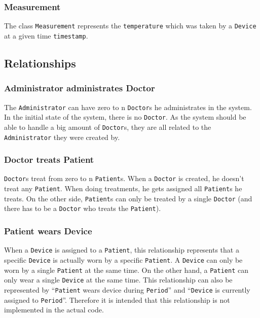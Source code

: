 \documentclass[fontsize=12pt,
               paper=a4,
               twoside=false,
               parskip=half,
               ]{scrartcl}
\begin{document}
\subsubsection{Measurement}
The class \texttt{Measurement} represents the \texttt{temperature} which was taken by a \texttt{Device} at a given time \texttt{timestamp}.


\subsection{Relationships}


\subsubsection{Administrator administrates Doctor}

The \texttt{Administrator} can have zero to n \texttt{Doctor}s he administrates in the system. In the initial state of the system, there is no \texttt{Doctor}. As the system should be able to handle a big amount of \texttt{Doctor}s, they are all related to the \texttt{Administrator} they were created by.


\subsubsection{Doctor treats Patient}

\texttt{Doctor}s treat from zero to n \texttt{Patient}s. When a \texttt{Doctor} is created, he doesn't treat any \texttt{Patient}. When doing treatments, he gets assigned all \texttt{Patient}s he treats. On the other side, \texttt{Patient}s can only be treated by a single \texttt{Doctor} (and there has to be a \texttt{Doctor} who treats the \texttt{Patient}).


\subsubsection{Patient wears Device}

When a \texttt{Device} is assigned to a \texttt{Patient}, this relationship represents that a specific \texttt{Device} is actually worn by a specific \texttt{Patient}. A \texttt{Device} can only be worn by a single \texttt{Patient} at the same time. On the other hand, a \texttt{Patient} can only wear a single \texttt{Device} at the same time. This relationship can also be represented by \enquote{\texttt{Patient} wears device during \texttt{Period}} and \enquote{\texttt{Device} is currently assigned to \texttt{Period}}. Therefore it is intended that this relationship is not implemented in the actual code.
\end{document}
